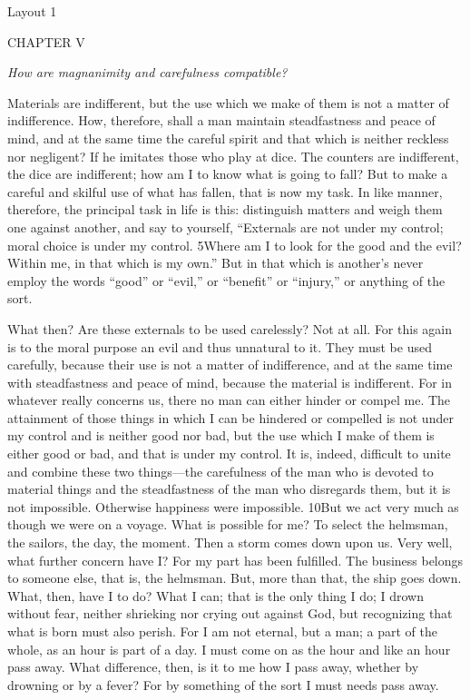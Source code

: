 

Layout 1

CHAPTER V

\emph{How are magnanimity and carefulness compatible?}

Materials are indifferent, but the use which we make of them is not a matter of indifference. How, therefore, shall a man maintain steadfastness and peace of mind, and at the same time the careful spirit and that which is neither reckless nor negligent? If he imitates those who play at dice. The counters are indifferent, the dice are indifferent; how am I to know what is going to fall? But to make a careful and skilful use of what has fallen, that is now my task. In like manner, therefore, the principal task in life is this: distinguish matters and weigh them one against another, and say to yourself, ``Externals are not under my control; moral choice is under my control. 5Where am I to look for the good and the evil? Within me, in that which is my own.'' But in that which is another's never employ the words ``good'' or ``evil,'' or ``benefit'' or ``injury,'' or anything of the sort.

What then? Are these externals to be used carelessly? Not at all. For this again is to the moral purpose an evil and thus unnatural to it. They must be used carefully, because their use is not a matter of indifference, and at the same time with steadfastness and peace of mind, because the material is indifferent. For in whatever really concerns us, there no man can either hinder or compel me. The attainment of those things in which I can be hindered or compelled is not under my control and is neither good nor bad, but the use which I make of them is either good or bad, and that is under my control. It is, indeed, difficult to unite and combine these two things—the carefulness of the man who is devoted to material things and the steadfastness of the man who disregards them, but it is not impossible. Otherwise happiness were impossible. 10But we act very much as though we were on a voyage. What is possible for me? To select the helmsman, the sailors, the day, the moment. Then a storm comes down upon us. Very well, what further concern have I? For my part has been fulfilled. The business belongs to someone else, that is, the helmsman. But, more than that, the ship goes down. What, then, have I to do? What I can; that is the only thing I do; I drown without fear, neither shrieking nor crying out against God, but recognizing that what is born must also perish. For I am not eternal, but a man; a part of the whole, as an hour is part of a day. I must come on as the hour and like an hour pass away. What difference, then, is it to me how I pass away, whether by drowning or by a fever? For by something of the sort I must needs pass away.

